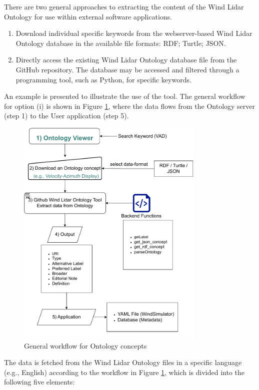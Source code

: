 \documentclass[remotesensing,article,submit,pdftex,moreauthors]{Definitions/mdpi}
\begin{document}
There are two general approaches to extracting the content of the Wind Lidar Ontology for use within external software applications. 
\begin{enumerate}[label=(\roman*)]

    \item Download individual specific keywords from the webserver-based Wind Lidar Ontology database in the available file formats: RDF; Turtle; JSON.

    \item Directly access the existing Wind Lidar Ontology database file from the GitHub repository. The database may be accessed and filtered through a programming tool, such as Python, for specific keywords.

\end{enumerate}
An example is presented to illustrate the use of the tool.
The general workflow for option (i) is shown in Figure \ref{Ontology_workflow}, where the data flows from the Ontology server (step 1) to the User application (step 5).
\begin{figure}[h!]
    \centering
    \includegraphics[width=0.8\textwidth]{Figures/Ontology_flow.drawio.pdf}
    \caption{General workflow for Ontology concepts}
    \label{Ontology_workflow}
\end{figure}
\newpage
The data is fetched from the Wind Lidar Ontology files in a specific language (e.g., English) according to the workflow in Figure \ref{Ontology_workflow}, which is divided into the following five elements:
\end{document}
